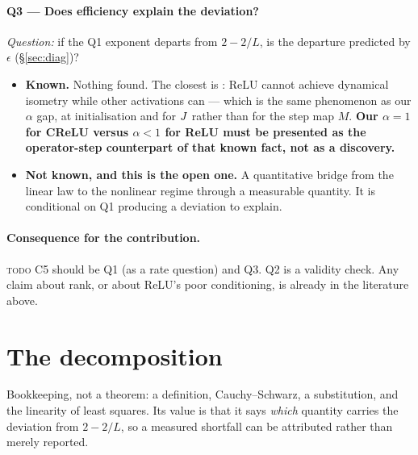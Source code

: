 \documentclass{article}
\newcommand{\TD}{{\color{orange!85!black}\textsc{todo}}}
\newcommand{\NOTE}[1]{{\color{gray}\small #1}}
\theoremstyle{plain}\newtheorem{theorem}{Theorem}\newtheorem{lemma}[theorem]{Lemma}
\theoremstyle{definition}\newtheorem{definition}[theorem]{Definition}
\begin{document}
\paragraph{Q3 --- Does efficiency explain the deviation?}
\emph{Question:} if the Q1 exponent departs from $2-2/L$, is the departure predicted by
$\epsilon$ (\S\ref{sec:diag})?
\begin{itemize}[leftmargin=*,itemsep=0pt]
  \item \textbf{Known.} Nothing found. The closest is \cite{pennington2017resurrecting}: ReLU
        cannot achieve dynamical isometry while other activations can --- which is the same
        phenomenon as our $\alpha$ gap, at initialisation and for $J$ rather than for the step
        map $M$. \textbf{Our $\alpha=1$ for CReLU versus $\alpha<1$ for ReLU must be presented as
        the operator-step counterpart of that known fact, not as a discovery.}
  \item \textbf{Not known, and this is the open one.} A quantitative bridge from the linear law to
        the nonlinear regime through a measurable quantity. It is conditional on Q1 producing a
        deviation to explain.
\end{itemize}

\paragraph{Consequence for the contribution.} \TD{} C5 should be Q1 (as a rate question) and Q3.
Q2 is a validity check. Any claim about rank, or about ReLU's poor conditioning, is already in the
literature above.

\section{The decomposition}\label{sec:decomp}

\NOTE{Bookkeeping, not a theorem: a definition, Cauchy--Schwarz, a substitution, and the linearity
of least squares. Its value is that it says \emph{which} quantity carries the deviation from
$2-2/L$, so a measured shortfall can be attributed rather than merely reported.}
\end{document}
